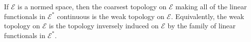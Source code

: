 If $\mathcal{E}$ is a normed space, then the coarsest topology on $\mathcal{E}$ making all of the linear functionals in $\mathcal{E}^*$ continuous is the weak topology on $\mathcal{E}$. Equivalently, the weak topology on $\mathcal{E}$ is the topology inversely induced on $\mathcal{E}$ by the family of linear functionals in $\mathcal{E}^*$.
